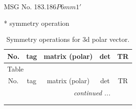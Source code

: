 \documentclass[fleqn,8pt]{jsarticle}
\begin{document}
\setcounter{MaxMatrixCols}{32}

\renewcommand{\tablename}{Table~}
\renewcommand{\figurename}{Figure~}
\begin{center}
\LARGE
MSG No. 183.186\quad$P6mm1'$
\end{center}
* symmetry operation
\renewcommand{\arraystretch}{1.3}
\begin{longtable}{ccccc}
\caption{Symmetry operations for 3d polar vector.}
 \\
 \hline \hline
No. & tag & matrix (polar) & det & TR \\ \hline \endfirsthead

\multicolumn{4}{l}{\tablename\ \thetable{}} \\
 \hline \hline
No. & tag & matrix (polar) & det & TR \\ \hline \endhead

 \hline \hline
\multicolumn{4}{r}{\footnotesize\it continued ...} \\ \endfoot

 \hline \hline
\multicolumn{4}{r}{} \\ \endlastfoot


\end{longtable}
\end{document}

